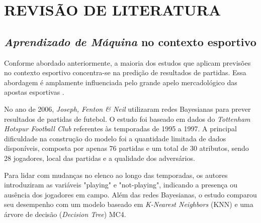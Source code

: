 %
\chapter{REVISÃO DE LITERATURA}

\section{\textit{Aprendizado de Máquina} no contexto esportivo}

Conforme abordado anteriormente, a maioria dos estudos que aplicam previsões no contexto esportivo concentra-se na predição de resultados de partidas. Essa abordagem é amplamente influenciada pelo grande apelo mercadológico das apostas esportivas \cite{Abidin2021}. 



No ano de 2006, \textit{Joseph, Fenton \& Neil} utilizaram redes Bayesianas para prever resultados de partidas de futebol. O estudo foi baseado em dados do \textit{Tottenham Hotspur Football Club} referentes às temporadas de 1995 a 1997. A principal dificuldade na construção do modelo foi a quantidade limitada de dados disponíveis, composta por apenas 76 partidas e um total de 30 atributos, sendo 28 jogadores, local das partidas e a qualidade dos adversários.

Para lidar com mudanças no elenco ao longo das temporadas, os autores introduziram as variáveis "playing" e "not-playing", indicando a presença ou ausência dos jogadores em campo. Além das redes Bayesianas, o estudo comparou seu desempenho com um modelo baseado em \textit{K-Nearest Neighbors} (KNN) e uma árvore de decisão (\textit{Decision Tree}) MC4. 


